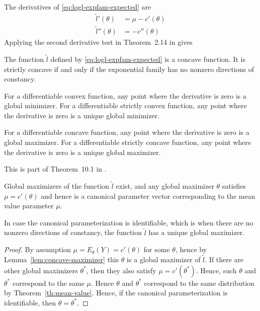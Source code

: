 The derivatives of \eqref{eq:logl-expfam-expected} are
\begin{subequations}
\begin{align}
   \tilde{l}'(\theta) & = \mu - c'(\theta)
   \\
   \tilde{l}''(\theta) & = - c''(\theta)
\end{align}
\end{subequations}
Applying the second derivative test
in Theorem~{2.14} in \citet{rockafellar-wets} gives
\begin{lemma}
The function $\tilde{l}$ defined by \eqref{eq:logl-expfam-expected}
is a concave function.
It is strictly concave if and only if the exponential family has no
nonzero directions of constancy.
\end{lemma}
\begin{lemma} \label{lem:concave-maximizer}
For a differentiable convex function, any point where the derivative
is zero is a global minimizer.
For a differentiable strictly convex function, any point where the derivative
is zero is a unique global minimizer.

For a differentiable concave function, any point where the derivative
is zero is a global maximizer.
For a differentiable strictly concave function, any point where the derivative
is zero is a unique global maximizer.
\end{lemma}
This is part of Theorem~{10.1} in \citet{rockafellar-wets}.

\begin{theorem} \label{th:mean-value-inversion}
Global maximizers of the function $\tilde{l}$ exist, and any global maximizer
$\theta$ satisfies $\mu = c'(\theta)$ and hence is a canonical parameter
vector corresponding to the mean value parameter $\mu$.

In case the canonical parameterization is identifiable, which is when there
are no nonzero directions of constancy, the function $\tilde{l}$ has
a unique global maximizer.
\end{theorem}
\begin{proof}
By assumption $\mu = E_\theta(Y) = c'(\theta)$ for some $\theta$,
hence by Lemma~\ref{lem:concave-maximizer} this $\theta$ is a global maximizer
of $\tilde{l}$.  If there are other global maximizers $\theta^*$,
then they also satisfy $\mu = c'(\theta^*)$.  Hence,
such $\theta$ and $\theta^*$ correspond to the same $\mu$.
Hence $\theta$ and $\theta^*$ correspond to the same distribution
by Theorem~\ref{th:mean-value}.
Hence, if the canonical parameterization is identifiable,
then $\theta = \theta^*$.
\end{proof}

